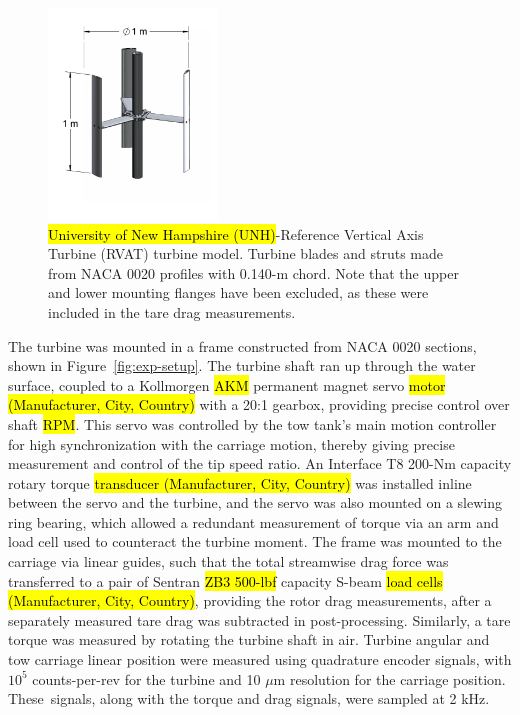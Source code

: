 \documentclass[energies,article,accept,moreauthors,pdftex,10pt,a4paper]{mdpi}
\theoremstyle{mdpi}
\newcounter{ex}
\newcounter{re}
\begin{document}
\begin{figure}[H]
\centering

\includegraphics[width=0.4\textwidth]{figures/turbine}

\caption{\hl {University of New Hampshire (UNH)}-Reference Vertical Axis Turbine (RVAT) turbine model. Turbine blades and struts made from NACA 0020
 profiles with 0.140-m chord. Note that the upper and lower mounting flanges have
 been excluded, as these were included in the tare drag measurements.}

\label{fig:turbine}
\end{figure}

The turbine was mounted in a frame constructed from NACA 0020 sections, shown in
Figure~\ref{fig:exp-setup}. The turbine shaft ran up through the water surface,
coupled to a Kollmorgen \hl {AKM}
  permanent magnet servo \hl {motor (Manufacturer, City, Country)} with a 20:1 gearbox,
providing precise control over shaft \hl {RPM}. This servo was controlled by the tow
tank's main motion controller for high synchronization with the carriage motion,
thereby giving precise measurement and control of the tip speed ratio. An Interface
T8 200-Nm capacity rotary torque \hl {transducer (Manufacturer, City, Country)} was installed inline between the
servo and the turbine, and the servo was also mounted on a slewing ring bearing,
which allowed a redundant measurement of torque via an arm and load cell used to
counteract the turbine moment. The frame was mounted to the carriage via linear
guides, such that the total streamwise drag force was transferred to a pair of
Sentran \hl {ZB3 500-lbf} %
 capacity S-beam \hl {load cells (Manufacturer, City, Country)}, providing the rotor drag
measurements, after a separately measured tare drag was subtracted in post-processing. Similarly, a tare torque was measured by rotating the turbine shaft
in air. Turbine angular and tow carriage linear position were measured using
quadrature encoder signals, with $10^5$ counts-per-rev for the turbine and 10 ${\mu}$m resolution for the carriage position. These~signals, along with
the torque and drag signals, were sampled at 2 kHz.
\end{document}
